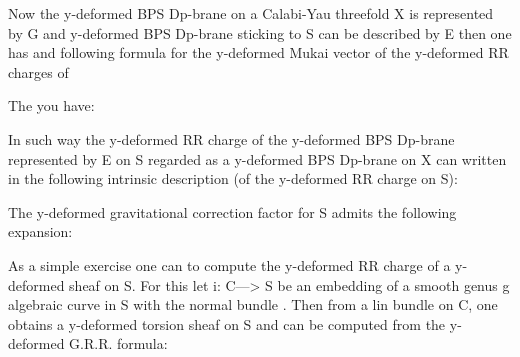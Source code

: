 \documentclass[a4paper,a4paper]{article}
\begin{document}
Now the y-deformed BPS Dp-brane on a Calabi-Yau threefold X  is represented by G and y-deformed BPS Dp-brane sticking to S can be described by E then one has \coordHE{} and following formula for the y-deformed Mukai vector of the y-deformed RR charges of \coordHE{}

\begin{center}
{  \coordHE{} }
\end{center}

The you have:

\begin{center}
{  \coordHE{} }
\end{center}

In such way the y-deformed RR charge of the y-deformed BPS Dp-brane represented by E on S regarded as a y-deformed BPS Dp-brane on  X can written in the following intrinsic description (of the y-deformed RR charge on S):

\begin{center}
{  \coordHE{} }
\end{center}

The y-deformed gravitational correction factor for S admits the following expansion:

\begin{center}
\setlength{\baselineskip}{30pt}
{  \coordHE{} }
\end{center}

As a simple exercise one can to compute the y-deformed RR charge of a y-deformed sheaf on S. For this let i: C---> S be an embedding of a smooth genus g algebraic curve in S with the normal bundle \coordHE{}. Then from a lin bundle \coordHE{} on C, one obtains a y-deformed torsion sheaf \coordHE{} on S and \coordHE{} can be computed from the y-deformed G.R.R. formula:
\end{document}
